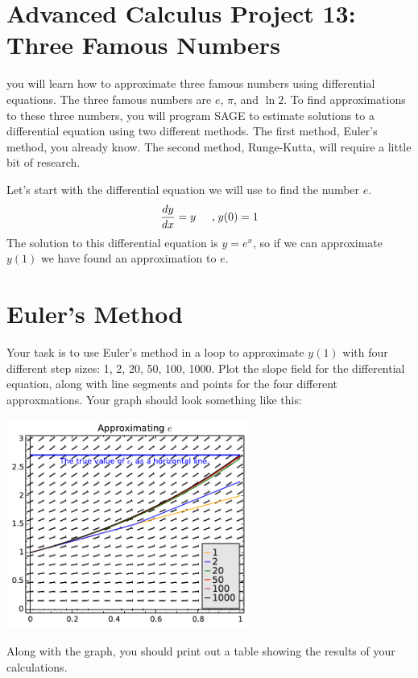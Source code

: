 \documentclass
[justified,nohyper]
{tufte-handout}
\begin{document}
\section{Advanced Calculus Project 13: Three Famous Numbers}

 you will learn how to approximate three famous
numbers using differential equations. The three famous numbers are $e$,
$\pi$, and $\ln 2$. To find approximations to these three numbers, you will
program SAGE to estimate solutions to a differential equation using two different
methods. The first method, Euler's method, you already know. The second method,
Runge-Kutta, will require a little bit of research.

Let's start with the differential equation we will use to find the number $e$.
\[
	\dfrac{dy}{dx} = y \hspace{0.5cm} \text{,} \; y(0)=1
\]
The solution to this differential equation is $y=e^{x}$, so if we can approximate
$y(1)$ we have found an approximation to $e$.

\section*{Euler's Method}
Your task is to use Euler's method in a loop to approximate $y(1)$ with four
different step sizes: 1, 2, 20, 50, 100, 1000. Plot the slope field for the differential
equation, along with line segments and points for the four different
approxmations. Your graph should look something like this:

\begin{center}{\includegraphics[width=8cm]{eulers.pdf}}\end{center}

Along with the graph, you should print out a table showing the results of your
calculations.
\end{document}

